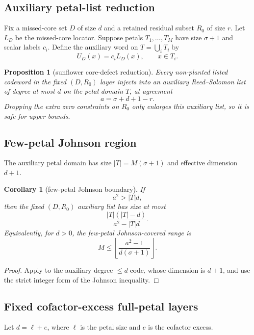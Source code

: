 \documentclass[11pt]{article}
\newtheorem{proposition}[theorem]{Proposition}
\newtheorem{corollary}[theorem]{Corollary}
\theoremstyle{definition}
\theoremstyle{remark}
\newcommand{\floor}[1]{\left\lfloor #1\right\rfloor}
\begin{document}
\subsection{Auxiliary petal-list reduction}

Fix a missed-core set $D$ of size $d$ and a retained residual subset $R_0$ of
size $r$.  Let $L_D$ be the missed-core locator.  Suppose petals
$T_1,\ldots,T_M$ have size $\sigma+1$ and scalar labels $c_i$.  Define the
auxiliary word on $T=\bigcup_i T_i$ by
\[
        U_D(x)=c_i L_D(x),\qquad x\in T_i.
\]

\begin{proposition}[sunflower core-defect reduction]\label{prop:pma}
Every non-planted listed codeword in the fixed $(D,R_0)$ layer injects into an
auxiliary Reed--Solomon list of degree at most $d$ on the petal domain $T$, at
agreement
\[
        a=\sigma+d+1-r.
\]
Dropping the extra zero constraints on $R_0$ only enlarges this auxiliary list,
so it is safe for upper bounds.
\end{proposition}

\subsection{Few-petal Johnson region}

The auxiliary petal domain has size $|T|=M(\sigma+1)$ and effective dimension
$d+1$.

\begin{corollary}[few-petal Johnson boundary]\label{cor:pma-johnson}
If
\[
        a^2>|T|d,
\]
then the fixed $(D,R_0)$ auxiliary list has size at most
\[
        \frac{|T|(|T|-d)}{a^2-|T|d}.
\]
Equivalently, for $d>0$, the few-petal Johnson-covered range is
\[
        M\le
        \floor{\frac{a^2-1}{d(\sigma+1)}}.
\]
\end{corollary}

\begin{proof}
Apply  to the auxiliary degree-$\le d$ code, whose dimension
is $d+1$, and use the strict integer form of the Johnson inequality.
\end{proof}

\subsection{Fixed cofactor-excess full-petal layers}

Let $d=\ell+e$, where $\ell$ is the petal size and $e$ is the cofactor excess.
\end{document}
